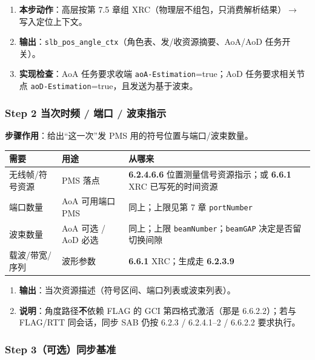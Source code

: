 \documentclass[11pt,a4paper]{ctexart}
\begin{document}
\begin{enumerate}[nosep]
  \item \textbf{本步动作}：高层按第 7.5 章组 XRC（物理层不组包，只消费解析结果）$\rightarrow$ 写入定位上下文。
  \item \textbf{输出}：\texttt{slb\_pos\_angle\_ctx}（角色表、发/收资源摘要、AoA/AoD 任务开关）。
  \item \textbf{实现检查}：AoA 任务要求收端 \texttt{aoA-Estimation}=true；AoD 任务要求相关节点 \texttt{aoD-Estimation}=true，且发送为基于波束。
\end{enumerate}

\subsubsection{Step 2 当次时频 / 端口 / 波束指示}

\textbf{步骤作用}：给出``这一次''发 PMS 用的符号位置与端口/波束数量。

\begin{table}[h]
\centering
\small
\begin{tabular}{L{3.5cm}L{4.8cm}L{4.7cm}}
\toprule
\textbf{需要} & \textbf{用途} & \textbf{从哪来} \\
\midrule
无线帧/符号资源 & PMS 落点 & \textbf{6.2.4.6.6} 位置测量信号资源指示；或 \textbf{6.6.1} XRC 已写死的时间资源 \\
端口数量 & AoA 可用端口 PMS & 同上；上限见第 7 章 \texttt{portNumber} \\
波束数量 & AoA 可选 / AoD 必选 & 同上；上限 \texttt{beamNumber}；\texttt{beamGAP} 决定是否留切换间隙 \\
载波/带宽/序列 & 波形参数 & \textbf{6.6.1} XRC；生成走 \textbf{6.2.3.9} \\
\bottomrule
\end{tabular}
\end{table}

\begin{enumerate}[nosep]
  \item \textbf{输出}：当次资源描述（符号区间、端口列表或波束列表）。
  \item \textbf{说明}：角度路径\textbf{不}依赖 FLAG 的 GCI 第四格式激活（那是 6.6.2.2）；若与 FLAG/RTT 同会话，同步 SAB 仍按 6.2.3 / 6.2.4.1--2 / 6.6.2.2 要求执行。
\end{enumerate}

\subsubsection{Step 3（可选）同步基准}
\end{document}
